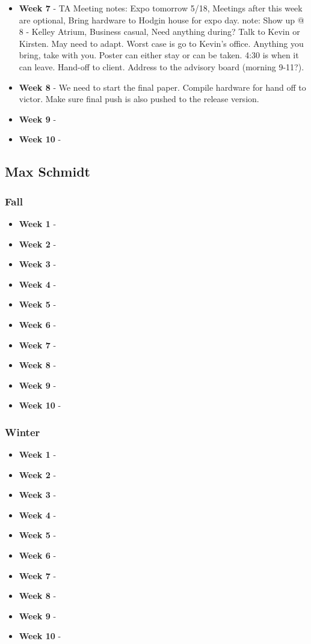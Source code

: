 \documentclass[onecolumn, draftclsnofoot,10pt, compsoc]{IEEEtran}
\begin{document}
\begin{itemize}
					\item \textbf{Week 7} - TA Meeting notes: Expo tomorrow 5/18, Meetings after this week are optional, Bring hardware to Hodgin house for expo day. note: Show up @ 8 - Kelley Atrium, Business casual, Need anything during? Talk to Kevin or Kirsten.  May need to adapt.  Worst case is go to Kevin's office. Anything you bring, take with you. Poster can either stay or can be taken. 4:30 is when it can leave. Hand-off to client. Address to the advisory board (morning 9-11?).
					\item \textbf{Week 8} -  We need to start the final paper. Compile hardware for hand off to victor. Make sure final push is also pushed to the release version.
					\item \textbf{Week 9} -
					\item \textbf{Week 10} -
				\end{itemize}
		\subsection{Max Schmidt}
			\subsubsection{Fall}
				\begin{itemize}
					\item \textbf{Week 1} -
					\item \textbf{Week 2} -
					\item \textbf{Week 3} -
					\item \textbf{Week 4} -
					\item \textbf{Week 5} -
					\item \textbf{Week 6} -
					\item \textbf{Week 7} -
					\item \textbf{Week 8} -
					\item \textbf{Week 9} -
					\item \textbf{Week 10} -
				\end{itemize}
			\subsubsection{Winter}
				\begin{itemize}
					\item \textbf{Week 1} -
					\item \textbf{Week 2} -
					\item \textbf{Week 3} -
					\item \textbf{Week 4} -
					\item \textbf{Week 5} -
					\item \textbf{Week 6} -
					\item \textbf{Week 7} -
					\item \textbf{Week 8} -
					\item \textbf{Week 9} -
					\item \textbf{Week 10} -
				\end{itemize}
\end{document}
